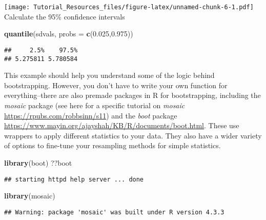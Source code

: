 \documentclass[
]{article}
\newenvironment{Shaded}{\begin{snugshade}}{\end{snugshade}}
\newcommand{\AttributeTok}[1]{\textcolor[rgb]{0.13,0.29,0.53}{#1}}
\newcommand{\FloatTok}[1]{\textcolor[rgb]{0.00,0.00,0.81}{#1}}
\newcommand{\FunctionTok}[1]{\textcolor[rgb]{0.13,0.29,0.53}{\textbf{#1}}}
\newcommand{\NormalTok}[1]{#1}
\begin{document}
\texttt{[image: Tutorial\_Resources\_files/figure-latex/unnamed-chunk-6-1.pdf]}
Calculate the 95\% confidence intervals

\begin{Shaded}
\begin{Highlighting}[]
\FunctionTok{quantile}\NormalTok{(sdvals, }\AttributeTok{probs =} \FunctionTok{c}\NormalTok{(}\FloatTok{0.025}\NormalTok{,}\FloatTok{0.975}\NormalTok{)) }
\end{Highlighting}
\end{Shaded}

\begin{verbatim}
##     2.5%    97.5% 
## 5.275811 5.780584
\end{verbatim}

This example should help you understand some of the logic behind
bootstrapping. However, you don't have to write your own function for
everything--there are also premade packages in R for bootstrapping,
including the \emph{mosaic} package (see here for a specific tutorial on
\emph{mosaic} \url{https://rpubs.com/robbsinn/s11}) and the \emph{boot}
package \url{https://www.mayin.org/ajayshah/KB/R/documents/boot.html}.
These use wrappers to apply different statistics to your data. They also
have a wider variety of options to fine-tune your resampling methods for
simple statistics.

\begin{Shaded}
\begin{Highlighting}[]
\FunctionTok{library}\NormalTok{(boot)}
\NormalTok{??boot}
\end{Highlighting}
\end{Shaded}

\begin{verbatim}
## starting httpd help server ... done
\end{verbatim}

\begin{Shaded}
\begin{Highlighting}[]
\FunctionTok{library}\NormalTok{(mosaic)}
\end{Highlighting}
\end{Shaded}

\begin{verbatim}
## Warning: package 'mosaic' was built under R version 4.3.3
\end{verbatim}
\end{document}
